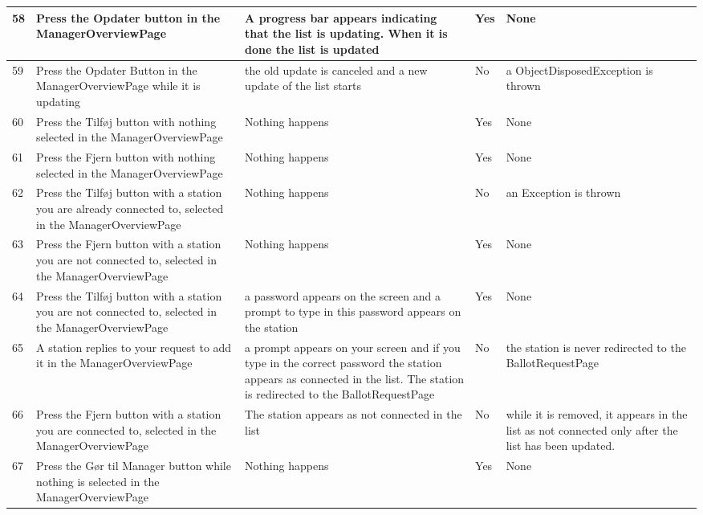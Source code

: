 \documentclass[a4paper]{report}
\begin{document}
\begin{longtable}{|p{5mm}|p{}|p{}|p{}|p{}|}
 \\\hline
58 & Press the Opdater button in the ManagerOverviewPage & A progress bar appears indicating that the list is updating. When it is done the list is updated  & Yes & None 

 \\\hline
59 & Press the Opdater Button in the ManagerOverviewPage while it is updating & the old update is canceled and a new update of the list starts & No & a ObjectDisposedException is thrown

 \\\hline
60 & Press the Tilf\o j button with nothing selected in the ManagerOverviewPage & Nothing happens & Yes & None

 \\\hline
61 & Press the Fjern button with nothing selected in the ManagerOverviewPage & Nothing happens & Yes & None

 \\\hline
62 & Press the Tilf\o j button with a station you are already connected to, selected in the ManagerOverviewPage & Nothing happens & No & an Exception is thrown

 \\\hline
63 & Press the Fjern button with a station you are not connected to, selected in the ManagerOverviewPage & Nothing happens & Yes & None

 \\\hline
64 & Press the Tilf\o j button with a station you are not connected to, selected in the ManagerOverviewPage & a password appears on the screen and a prompt to type in this password appears on the station & Yes & None 

 \\\hline
65 & A station replies to your request to add it in the ManagerOverviewPage & a prompt appears on your screen and if you type in the correct password the station appears as connected in the list. The station is redirected to the BallotRequestPage & No & the station is never redirected to the BallotRequestPage 

\\\hline
66 & Press the Fjern button with a station you are connected to, selected in the ManagerOverviewPage & The station appears as not connected in the list & No & while it is removed, it appears in the list as not connected only after the list has been updated. 

\\\hline
67 & Press the G\o r til Manager button while nothing is selected in the ManagerOverviewPage & Nothing happens & Yes & None 


\end{longtable}
\end{document}
